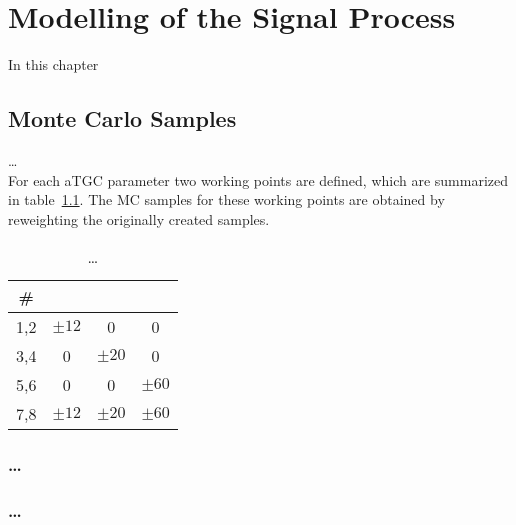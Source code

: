 \chapter{Modelling of the Signal Process}
\label{chap:signal}
In this chapter 
\section{Monte Carlo Samples}
\dots \\
For each aTGC parameter two working points are defined, which are summarized in table~\ref{tab:signal:aTGCpoints}. The MC samples for these working points are obtained by reweighting the originally created samples.
\begin{table}
	\centering
	\caption{\dots}
	\label{tab:signal:aTGCpoints}
	\begin{tabular}{cccc}
	\hline
	\# & \Tcwww & \Tccw & \Tcb \\
	\hline
	1,2 &  $\pm 12$ & 0 & 0\\
	3,4 & 0 &  $\pm 20$ & 0\\
	5,6 & 0 & 0 &  $\pm 60$\\
	7,8 &	$\pm 12$ & $\pm 20$ & $\pm 60$\\
	\hline
	\end{tabular}
\end{table} 
\subsection{\dots}
\subsection{\dots}
